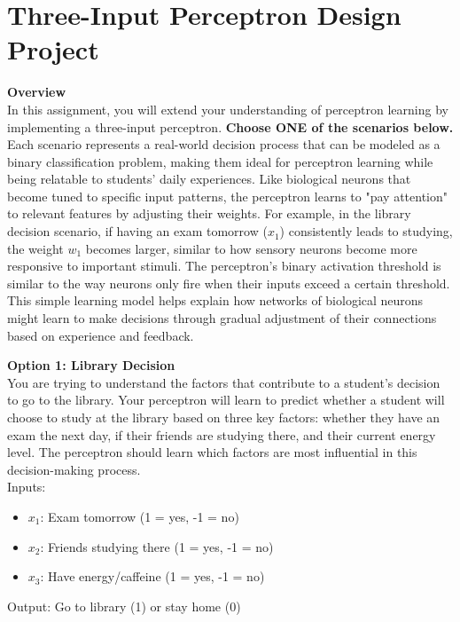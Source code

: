\newpage
\section{Three-Input Perceptron Design Project}

\noindent\textbf{Overview}\\
In this assignment, you will extend your understanding of perceptron learning by implementing a three-input perceptron. \textbf{Choose ONE of the scenarios below.} Each scenario represents a real-world decision process that can be modeled as a binary classification problem, making them ideal for perceptron learning while being relatable to students' daily experiences. Like biological neurons that become tuned to specific input patterns, the perceptron learns to "pay attention" to relevant features by adjusting their weights. For example, in the library decision scenario, if having an exam tomorrow ($x_1$) consistently leads to studying, the weight $w_1$ becomes larger, similar to how sensory neurons become more responsive to important stimuli. The perceptron's binary activation threshold is similar to the way neurons only fire when their inputs exceed a certain threshold. This simple learning model helps explain how networks of biological neurons might learn to make decisions through gradual adjustment of their connections based on experience and feedback.

\vspace{0.4cm}
\noindent\textbf{Option 1: Library Decision}\\
You are trying to understand the factors that contribute to a student's decision to go to the library. Your perceptron will learn to predict whether a student will choose to study at the library based on three key factors: whether they have an exam the next day, if their friends are studying there, and their current energy level. The perceptron should learn which factors are most influential in this decision-making process.\\
Inputs:
\begin{itemize}
\item $x_1$: Exam tomorrow (1 = yes, -1 = no)
\item $x_2$: Friends studying there (1 = yes, -1 = no)
\item $x_3$: Have energy/caffeine (1 = yes, -1 = no)
\end{itemize}
Output: Go to library (1) or stay home (0)


